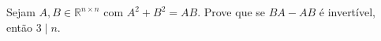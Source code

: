 Sejam \(A,B \in \mathbb{R}^{n\times n}\) com \(A^2+B^2=AB\). Prove que se \(BA-AB\) é invertível, então \(3 \mid n\).
